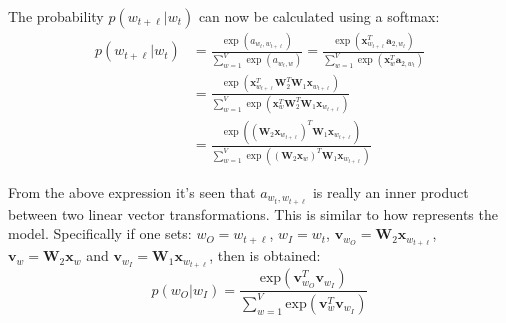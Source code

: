 The probability $p(w_{t + \ell} | w_t)$ can now be calculated using a softmax:
\begin{equation}
\begin{aligned}
p(w_{t + \ell} | w_t)
&= \frac{
	\exp(a_{w_t, w_{t + \ell}})
}{
	\sum_{w=1}^V \exp(a_{w_t, w})
}
= \frac{
	\exp( \mathbf{x}_{w_{t+\ell}}^T \mathbf{a}_{2,w_t} )
}{
	\sum_{w=1}^V \exp(\mathbf{x}_{w}^T \mathbf{a}_{2,w_t})
} \\
&= \frac{
	\exp( \mathbf{x}_{w_{t+\ell}}^T \mathbf{W}_2^T \mathbf{W}_1 \mathbf{x}_{w_{t+\ell}})
}{
	\sum_{w=1}^V \exp(\mathbf{x}_{w}^T \mathbf{W}_2^T \mathbf{W}_1 \mathbf{x}_{w_{t+\ell}})
} \\
&= \frac{
	\exp( \left(\mathbf{W}_2 \mathbf{x}_{w_{t+\ell}} \right)^T \mathbf{W}_1 \mathbf{x}_{w_{t+\ell}})
}{
	\sum_{w=1}^V \exp( \left(\mathbf{W}_2 \mathbf{x}_{w}\right)^T \mathbf{W}_1 \mathbf{x}_{w_{t+\ell}})
}
\end{aligned}
\end{equation}

From the above expression it's seen that $a_{w_t, w_{t + \ell}}$ is really an inner product between two linear vector transformations. This is similar to how \cite{word2vec-details} represents the model. Specifically if one sets: $w_O = w_{t + \ell}$, $w_I = w_t$, $\mathbf{v}_{w_O} = \mathbf{W}_2 \mathbf{x}_{w_{t+\ell}}$, $\mathbf{v}_{w} = \mathbf{W}_2 \mathbf{x}_{w}$ and $\mathbf{v}_{w_I} = \mathbf{W}_1 \mathbf{x}_{w_{t + \ell}}$, then \cite[eq. 2]{word2vec-details} is obtained:
\begin{equation}
p(w_O | w_I) = \frac{
	\mathrm{exp}( \mathbf{v}_{w_O}^T \mathbf{v}_{w_I} )
}{
	\sum_{w=1}^V \mathrm{exp}( \mathbf{v}_{w}^T \mathbf{v}_{w_I} )
}
\end{equation}
